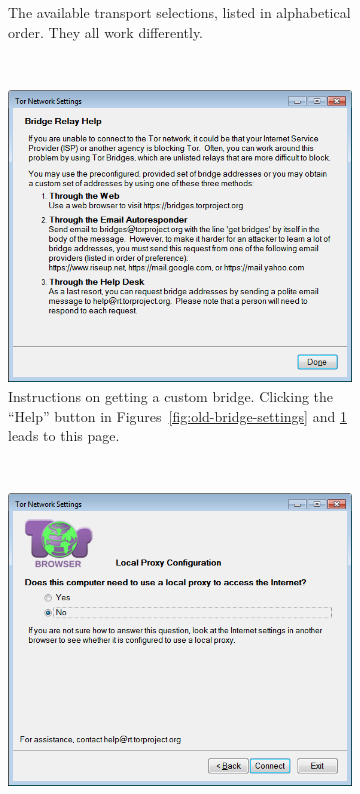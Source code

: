 \documentclass[USenglish,oneside,twocolumn]{article}
\begin{document}
\begin{figure}
\begin{subfigure}[b]{0.30\textwidth}
	\caption{The available transport selections, listed in alphabetical order. They all work differently.}
	\label{fig:old-bridge-combobox}
\end{subfigure}
~~~~~~~~~~
\begin{subfigure}[b]{0.30\textwidth}
	\includegraphics[width=\textwidth]{screenshots/OLD-bridgeHelp.png}
	\caption{Instructions on getting a custom bridge. Clicking the ``Help'' button in Figures~\ref{fig:old-bridge-settings} and \ref {fig:old-bridge-combobox} leads to this page.}
	\label{fig:old-bridge-help}
\end{subfigure}
~~~~~~~~~~
\begin{subfigure}[b]{0.30\textwidth}
	\includegraphics[width=\textwidth]{screenshots/OLD-proxy.png}

\end{subfigure}
\end{figure}
\end{document}
